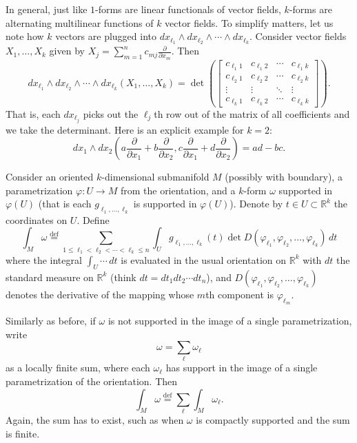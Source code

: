 \documentclass[12pt,openany]{book}
\newcommand{\R}{{\mathbb{R}}}
\theoremstyle{plain}
\theoremstyle{remark}
\theoremstyle{definition}
\theoremstyle{exercise}
\theoremstyle{example}
\begin{document}
In general, just like $1$-forms are linear functionals of vector fields,
$k$-forms are alternating multilinear functions of $k$ vector fields.
To simplify matters, let us note how
$k$ vectors are plugged into
$dx_{\ell_1} \wedge dx_{\ell_2} \wedge \cdots \wedge dx_{\ell_k}$.
Consider vector fields $X_1,\ldots,X_k$ given by
$X_j = \sum_{m=1}^n c_{m j} \frac{\partial}{\partial x_m}$.
Then
\begin{equation*}
dx_{\ell_1} \wedge
dx_{\ell_2} \wedge
\cdots \wedge
dx_{\ell_k}  (X_1,\ldots,X_k)
=
\det
\left(
\begin{bmatrix}
c_{\ell_1 1} & c_{\ell_1 2} & \cdots & c_{\ell_1 k} \\
c_{\ell_2 1} & c_{\ell_2 2} & \cdots & c_{\ell_2 k} \\
\vdots & \vdots & \ddots & \vdots \\
c_{\ell_k 1} & c_{\ell_k 2} & \cdots & c_{\ell_k k}
\end{bmatrix}
\right) .
\end{equation*}
That is, each $dx_{\ell_j}$ picks out the $\ell_j$th row out of the matrix
of all coefficients and we take the determinant.  Here is an explicit
example for $k=2$:
\begin{equation*}
dx_1 \wedge dx_2
\left(
a \frac{\partial}{\partial x_1} +
b \frac{\partial}{\partial x_2}
,
c \frac{\partial}{\partial x_1} +
d \frac{\partial}{\partial x_2}
\right)
=
ad-bc .
\end{equation*}

Consider
an oriented $k$-dimensional submanifold $M$
(possibly with boundary), a parametrization $\varphi \colon U \to M$
from the orientation,
and a $k$-form $\omega$
supported in $\varphi(U)$ (that is each $g_{\ell_1,\ldots,\ell_k}$ is supported in
$\varphi(U)$).
Denote by $t \in U \subset \R^k$
the coordinates on $U$.  Define
\begin{equation*}
\int_M \omega
\overset{\text{def}}{=}
\sum_{1 \leq \ell_1 < \ell_2 < \cdots < \ell_k \leq n}
\int_U
g_{\ell_1,\ldots,\ell_k}(t)
\det D (\varphi_{\ell_1},\varphi_{\ell_2},\ldots,\varphi_{\ell_k})
\,
dt
\end{equation*}
where the integral $\int_U \cdots\, dt$ is evaluated in the
usual orientation on $\R^k$ with $dt$ the standard
measure on $\R^k$ (think $dt = dt_1 dt_2 \cdots dt_n$), and
$D (\varphi_{\ell_1},\varphi_{\ell_2},\ldots,\varphi_{\ell_k})$
denotes the derivative of the mapping whose $m$th component
is $\varphi_{\ell_m}$.

Similarly as before, if $\omega$ is not supported in the
image of a single parametrization, write
\begin{equation*}
\omega = \sum_{\ell} \omega_\ell
\end{equation*}
as a locally finite sum,
where each $\omega_\ell$ has support in the image of a single
parametrization of the orientation.
Then
\begin{equation*}
\int_M \omega
\overset{\text{def}}{=}
\sum_{\ell}
\int_M \omega_\ell .
\end{equation*}
Again, the sum has to exist, such as when $\omega$ is compactly supported
and the sum is finite.
\end{document}
